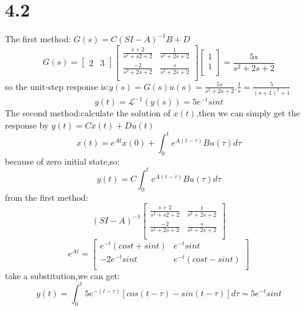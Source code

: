 \documentclass{article}
\begin{document}
\section*{4.2}
The first method: $G(s)=C(SI-A)^{-1}B+D$
\[G(s)=
\left[
\begin{array}{cc}
2 & 3
\end{array}
\right]
\left[
\begin{array}{cc}
\frac{s+2}{s^2+s2+2}& \frac{1}{s^2+2s+2} \\
\frac{-2}{s^2+2s+2} & \frac{s}{s^2+2s+2}\\
\end{array}
\right]
\left[
\begin{array}{c}
1\\
1\\
\end{array}
\right]
=
\frac{5s}{s^2+2s+2}
\]
so the unit-step response is:$y(s)=G(s)u(s)=\frac{5s}{s^2+2s+2}.\frac{1}{s}=\frac{5}{(s+1)^2+1}$
\[y(t)=\mathcal{L}^{-1}(y(s))=5e^{-t}sint\]
The second method:calculate the solution of $x(t)$,then we can simply get the response by $y(t)=Cx(t)+Du(t)$
\[x(t)=e^{At}x(0)+\int_{0}^{t}e^{A(t-\tau)}Bu(\tau)d\tau\]
because of zero initial state,so:
\[y(t)=C\int_{0}^{t}e^{A(t-\tau)}Bu(\tau)d\tau\]
from the first method:
\[
(SI-A)^{-1}
\left[
\begin{array}{cc}
\frac{s+2}{s^2+s2+2}&\frac{1}{s^2+2s+2} \\
\frac{-2}{s^2+2s+2} & \frac{s}{s^2+2s+2}\\
\end{array}
\right]
\]
\[e^{At}
=
\left[
\begin{array}{cc}
e^{-t}(cost+sint) & e^{-t}sint \\
-2e^{-t}sint & e^{-t}(cost-sint)\\
\end{array}
\right]
\]
take a substitution,we can get:
\[y(t)=\int_{0}^{t}5e^{-(t-\tau)}[cos(t-\tau)-sin(t-\tau)]d\tau=5e^{-t}sint\]
\end{document}
